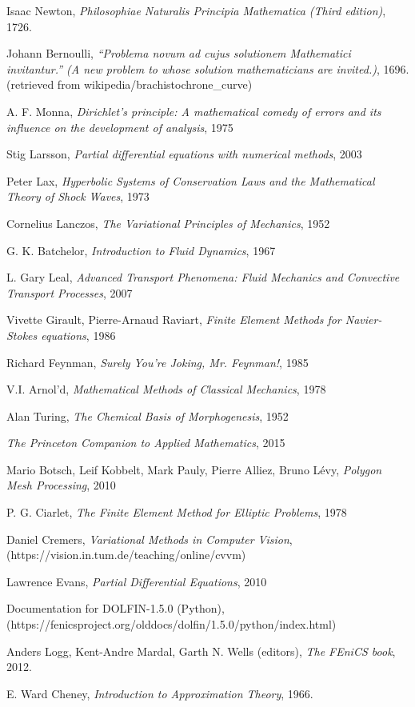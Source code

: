 \documentclass[11pt,a4paper]{memoir}
\begin{document}
\begin{thebibliography}{9}

Isaac Newton, \textit{Philosophiae Naturalis Principia Mathematica (Third edition)}, 1726.

Johann Bernoulli, \textit{``Problema novum ad cujus solutionem Mathematici invitantur.'' (A new problem to whose solution mathematicians are invited.)}, 1696.
(retrieved from wikipedia/brachistochrone\_curve)

A. F. Monna, \textit{Dirichlet's principle: A mathematical comedy of errors and its influence on the development of analysis}, 1975

Stig Larsson, \textit{Partial differential equations with numerical methods}, 2003

Peter Lax, \textit{Hyperbolic Systems of Conservation Laws and the Mathematical Theory of Shock Waves}, 1973

Cornelius Lanczos, \textit{The Variational Principles of Mechanics}, 1952

G. K. Batchelor, \textit{Introduction to Fluid Dynamics}, 1967

L. Gary Leal, \textit{Advanced Transport Phenomena: Fluid Mechanics and Convective Transport Processes}, 2007

Vivette Girault, Pierre-Arnaud Raviart, \textit{Finite Element Methods for Navier-Stokes equations}, 1986

Richard Feynman, \textit{Surely You're Joking, Mr. Feynman!}, 1985

V.I. Arnol'd, \textit{Mathematical Methods of Classical Mechanics}, 1978

Alan Turing, \textit{The Chemical Basis of Morphogenesis}, 1952

\textit{The Princeton Companion to Applied Mathematics}, 2015

Mario Botsch, Leif Kobbelt, Mark Pauly, Pierre Alliez, Bruno L\'evy, \textit{Polygon Mesh Processing}, 2010

P. G. Ciarlet, \textit{The Finite Element Method for Elliptic Problems}, 1978

Daniel Cremers, \textit{Variational Methods in Computer Vision},\\(https://vision.in.tum.de/teaching/online/cvvm)

Lawrence Evans, \textit{Partial Differential Equations}, 2010

Documentation for DOLFIN-1.5.0 (Python),\\
(https://fenicsproject.org/olddocs/dolfin/1.5.0/python/index.html)

Anders Logg, Kent-Andre Mardal, Garth N. Wells (editors), \textit{The FEniCS book}, 2012.

E. Ward Cheney, \textit{Introduction to Approximation Theory}, 1966.

\end{thebibliography}
\end{document}
